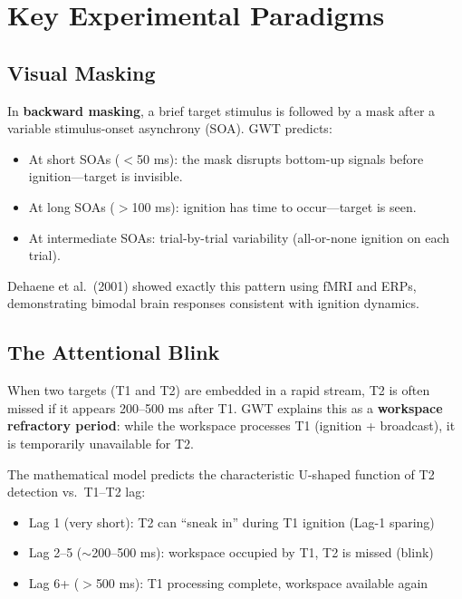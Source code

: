 \documentclass[11pt,a4paper]{report}
\begin{document}
\chapter{Key Experimental Paradigms}

\section{Visual Masking}

In \textbf{backward masking}, a brief target stimulus is followed by a mask after a variable stimulus-onset asynchrony (SOA). GWT predicts:

\begin{itemize}[leftmargin=1.5em]
  \item At short SOAs ($<$50 ms): the mask disrupts bottom-up signals before ignition---target is invisible.
  \item At long SOAs ($>$100 ms): ignition has time to occur---target is seen.
  \item At intermediate SOAs: trial-by-trial variability (all-or-none ignition on each trial).
\end{itemize}

Dehaene et al.\ (2001) showed exactly this pattern using fMRI and ERPs, demonstrating bimodal brain responses consistent with ignition dynamics.

\section{The Attentional Blink}

When two targets (T1 and T2) are embedded in a rapid stream, T2 is often missed if it appears 200--500 ms after T1. GWT explains this as a \textbf{workspace refractory period}: while the workspace processes T1 (ignition + broadcast), it is temporarily unavailable for T2.

The mathematical model predicts the characteristic U-shaped function of T2 detection vs.\ T1--T2 lag:
\begin{itemize}[leftmargin=1.5em]
  \item Lag 1 (very short): T2 can ``sneak in'' during T1 ignition (Lag-1 sparing)
  \item Lag 2--5 ($\sim$200--500 ms): workspace occupied by T1, T2 is missed (blink)
  \item Lag 6+ ($>$500 ms): T1 processing complete, workspace available again
\end{itemize}
\end{document}
